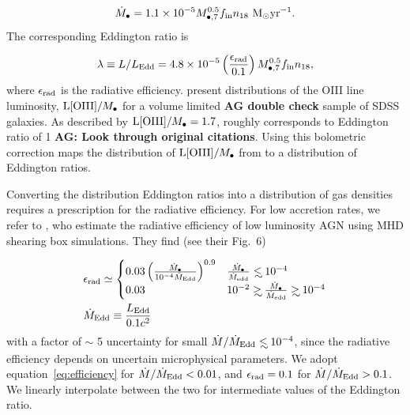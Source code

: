 \documentclass[usenatbib,fleqn]{mnras}
\newcommand\lsim{\mathrel{\rlap{\lower4pt\hbox{\hskip1pt$\sim$}}
    \raise1pt\hbox{$<$}}}
\newcommand\gsim{\mathrel{\rlap{\lower4pt\hbox{\hskip1pt$\sim$}}
    \raise1pt\hbox{$>$}}}
\newcommand{\Mbh}[1][]{M_{\bullet#1}}
\newcommand{\Msun}{{\rm M_\odot}}
\begin{document}
\begin{equation}
  \dot{M}_{\bullet} = 1.1\times 10^{-5} \Mbh[,7]^{0.5} f_{\rm in}
  n_{18} \,\,\Msun {\rm yr}^{-1}.
\end{equation}
%
The corresponding Eddington ratio is

\begin{equation}
  \lambda\equiv L/L_{\rm Edd} = 4.8 \times 10^{-5}
  \left(\frac{\epsilon_{\rm rad}}{0.1}\right) \Mbh[,7]^{0.5} f_{\rm in}
  n_{18},
\label{eq:n18Edd}
\end{equation}
%
where $\epsilon_{\rm rad}$ is the radiative
efficiency. \citet{Kauffmann&Heckman2009} present distributions of the
OIII line luminosity, ${\rm L[OIII]}/\Mbh$ for a volume limited {\bf
  AG double check} sample of SDSS galaxies.  As described by
\citet{Kauffmann&Heckman2009} ${\rm L[OIII]}/\Mbh=1.7$, roughly
corresponds to Eddington ratio of 1 {\bf AG: Look through original
  citations}. Using this bolometric correction maps the distribution
of ${\rm L[OIII]}/\Mbh$ from \citet{Kauffmann&Heckman2009} to a
distribution of Eddington ratios.

Converting the distribution Eddington ratios into a distribution of
gas densities requires a prescription for the radiative efficiency.  For
low accretion rates, we refer to \citet{Sharma+2007}, who estimate the
radiative efficiency of low luminosity AGN using MHD shearing box
simulations.  They find (see their Fig.~6)

\begin{align}
&\epsilon_{\rm rad} \simeq 
\begin{cases}
  0.03 \left(\frac{\dot{M}_{\bullet}}{10^{-4}\dot{M}_{\rm Edd}}\right)^{0.9} & \frac{\dot{M}_{\bullet}}{\dot{M}_{\rm edd}} \lsim 10^{-4} \\
 0.03 &  10^{-2} \gsim \frac{\dot{M}_{\bullet}}{\dot{M}_{\rm edd}}
 \gsim  10^{-4}
\end{cases}\nonumber\\
&\dot{M}_{\rm Edd} \equiv \frac{L_{\rm Edd}}{0.1 c^2}
\label{eq:efficiency}
\end{align}
%
with a factor of $\sim$ 5 uncertainty for small $\dot{M}/\dot{M}_{\rm
  Edd}\lsim 10^{-4}$, since the radiative efficiency depends on
uncertain microphysical parameters. We adopt
equation~\eqref{eq:efficiency} for $\dot{M}/\dot{M}_{\rm Edd}<0.01$,
and $\epsilon_{\rm rad}=0.1$ for $\dot{M}/\dot{M}_{\rm Edd}>0.1$. We
linearly interpolate between the two for intermediate values of the
Eddington ratio.
\end{document}
